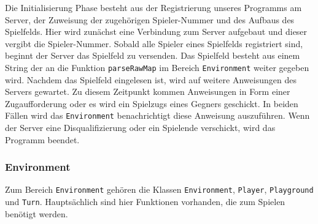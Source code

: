 \documentclass[12pt,a4paper]{article}
\begin{document}
Die Initialisierung Phase besteht aus der Registrierung unseres Programms am Server, der Zuweisung der zugehörigen Spieler-Nummer und des Aufbaus des Spielfelds. Hier wird zunächst eine Verbindung zum Server aufgebaut und dieser vergibt die Spieler-Nummer. Sobald alle Spieler eines Spielfelds registriert sind, beginnt der Server das Spielfeld zu versenden. Das Spielfeld besteht aus einem String der an die Funktion \texttt{parseRawMap} im Bereich \texttt{Environment} weiter gegeben wird. Nachdem das Spielfeld eingelesen ist, wird auf weitere Anweisungen des Servers gewartet. Zu diesem Zeitpunkt kommen Anweisungen in Form einer Zugaufforderung oder es wird ein Spielzugs eines Gegners geschickt. In beiden Fällen wird das \texttt{Environment} benachrichtigt diese Anweisung auszuführen. Wenn der Server eine Disqualifizierung oder ein Spielende verschickt, wird das Programm beendet.

\subsubsection{Environment}
Zum Bereich \texttt{Environment} gehören die Klassen \texttt{Environment}, \texttt{Player}, \texttt{Playground} und \texttt{Turn}. Hauptsächlich sind hier Funktionen vorhanden, die zum Spielen benötigt werden.
\end{document}
